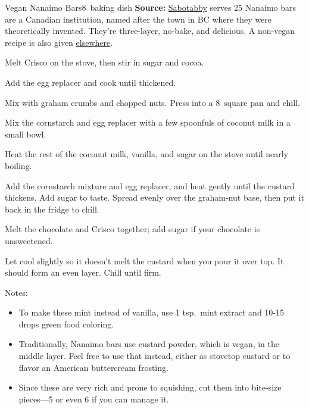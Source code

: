 \begin{recipe}{Vegan Nanaimo Bars}{8\inch{}\inch\ baking dish \hfill }{\textbf{Source:} \href{https://sabotabby.dreamwidth.org/2062019.html}{Sabotabby} \hfill serves 25}
  \freeform Nanaimo bars are a Canadian institution, named after the town in BC where they were theoretically invented. They're three-layer, no-bake, and delicious. A non-vegan recipe is also given \hyperref[Nanaimo Bars]{elsewhere}.

Melt Crisco on the stove, then stir in sugar and cocoa.

Add the egg replacer and cook until thickened.

Mix with graham crumbs and chopped nuts. Press into a 8\inch\ square pan and chill.

Mix the cornstarch and egg replacer with a few spoonfuls of coconut milk in a small bowl.

Heat the rest of the coconut milk, vanilla, and sugar on the stove until nearly boiling.

\newstep Add the cornstarch mixture and egg replacer, and heat gently until the custard thickens. Add sugar to taste.
\newstep Spread evenly over the graham-nut base, then put it back in the fridge to chill.

Melt the chocolate and Crisco together; add sugar if your chocolate is unsweetened.

\newstep Let cool slightly so it doesn't melt the custard when you pour it over top. It should form an even layer. Chill until firm.

\freeform Notes:
\begin{itemize}
  \item To make these mint instead of vanilla, use 1 tsp.\ mint extract and 10-15 drops green food coloring.
  \item Traditionally, Nanaimo bars use custard powder, which is vegan, in the middle layer. Feel free to use that instead, either as stovetop custard or to flavor an American buttercream frosting.
  \item Since these are very rich and prone to squishing, cut them into bite-size pieces---5 or even 6 if you can manage it.
\end{itemize}
\end{recipe}